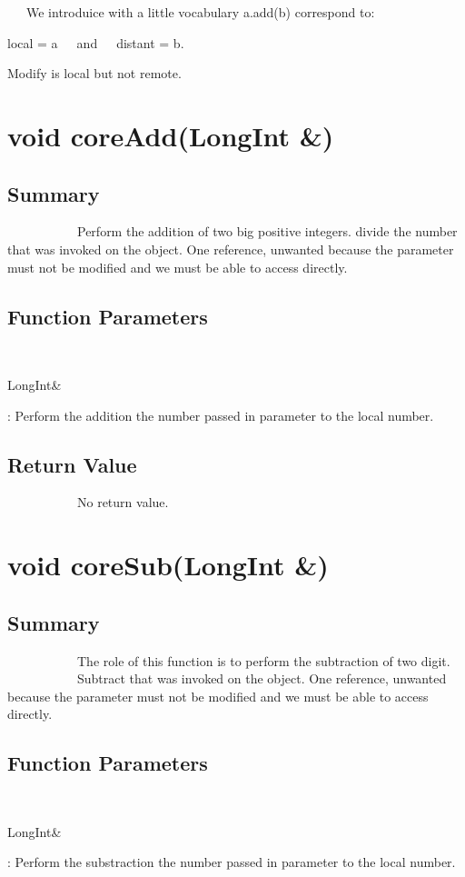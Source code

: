 \documentclass[11pt]{report}
\begin{document}
      \begin{bf}
~~~We introduice with a little vocabulary
a.add(b) correspond to: \begin{center}  local = a~~~and~~~distant = b. \end{center}
\begin{center}Modify is local but not remote.\end{center}
    \end{bf}


\section{void coreAdd(LongInt \&)}
	\subsection{Summary}
~~~~~~~~~~~Perform the addition of two big positive integers.
divide the number that was invoked on the object.
One reference, unwanted because the parameter must not be modified and
we must be able to access directly.
	\subsection{Function Parameters}
~~~~~~~~~~~\begin{bf}LongInt\&\end{bf}: Perform the addition the number passed in parameter to the local number.

\subsection{Return Value}
~~~~~~~~~~~No return value.

\section{void coreSub(LongInt \&)}
	\subsection{Summary}
~~~~~~~~~~~The role of this function is to perform the subtraction of two digit.
~~~~~~~~~~~Subtract that was invoked on the object.
One reference, unwanted because the parameter must not be modified and
we must be able to access directly.
	\subsection{Function Parameters}
~~~~~~~~~~~\begin{bf}LongInt\&\end{bf}: Perform the substraction the number passed in parameter to the local number.
\end{document}
